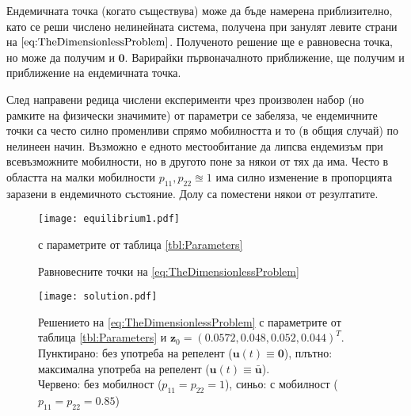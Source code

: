 
Ендемичната точка (когато съществува) може да бъде намерена приблизително, като се реши числено нелинейната система, получена при занулят левите страни на $\eqref{eq:TheDimensionlessProblem}$.
Полученото решение ще е равновесна точка, но може да получим и $\mathbf{0}$.
Варирайки първоначалното приближение, ще получим и приближение на ендемичната точка.

След направени редица числени експерименти чрез произволен набор (но рамките на физически значимите) от параметри се забеляза, че ендемичните точки са често силно променливи спрямо мобилността и то (в общия случай) по нелинеен начин.
Възможно е едното местообитание да липсва ендемизъм при всевъзможните мобилности, но в другото поне за някои от тях да има.
Често в областта на малки мобилности $p_{11}, p_{22} \approxeq 1$ има силно изменение в пропорцията заразени в ендемичното състояние.
Долу са поместени някои от резултатите.

\begin{figure}[h]
  \centering
  \texttt{[image: equilibrium1.pdf]}
  \caption{Равновесните точки на \eqref{eq:TheDimensionlessProblem}} с параметрите от таблица \ref{tbl:Parameters}
  \label{fig:EquilibriumPoints}
\end{figure}
% 

\begin{figure}[h]
  \centering
  \texttt{[image: solution.pdf]}
  \caption{Решението на \eqref{eq:TheDimensionlessProblem} с параметрите от таблица \ref{tbl:Parameters} и $\mathbf{z}_0=(0.0572, 0.048, 0.052, 0.044)^T$.\\ Пунктирано: без употреба на репелент ($\mathbf{u}(t) \equiv \mathbf{0}$), плътно: максимална употреба на репелент ($\mathbf{u}(t) \equiv \bar{\mathbf{u}}$).\\ Червено: без мобилност ($p_{11}=p_{22}=1$), синьо: с мобилност ($p_{11}=p_{22}=0.85$)}
  \label{fig:Solution}
\end{figure}
